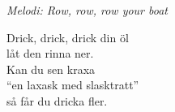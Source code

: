 {\footnotesize\textit{Melodi: Row, row, row your boat}}\par
\vspace{10pt}
Drick, drick, drick din öl\\
låt den rinna ner.\\
Kan du sen kraxa\\
``en laxask med slasktratt''\\
så får du dricka fler.
